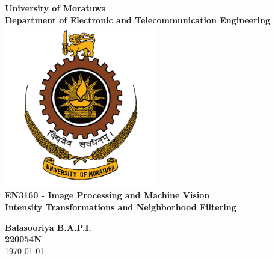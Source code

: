 \documentclass[12pt]{article}
\begin{document}

\begin{titlepage}
    \centering
    \vspace*{1cm}
    
    {\huge\textbf{University of Moratuwa}}\\[1cm]
    
    {\Large\textbf{Department of Electronic and Telecommunication Engineering}}\\[0.5cm]
    
    \includegraphics[width=0.5\textwidth]{resources/University_of_Moratuwa_logo.png}\\[1cm]
    
    {\large\textbf{EN3160 - Image Processing and Machine Vision}}\\[1cm]
    
    {\LARGE\textbf{Intensity Transformations and Neighborhood Filtering}}\\[1cm]


    \vspace{0.1cm}
    
    \begin{center}
        {\large\textbf{Balasooriya B.A.P.I.} \\
        \textbf{220054N} \\[0.5cm]
        \today}
    \end{center}
    
    \vfill
\end{titlepage}
\end{document}
